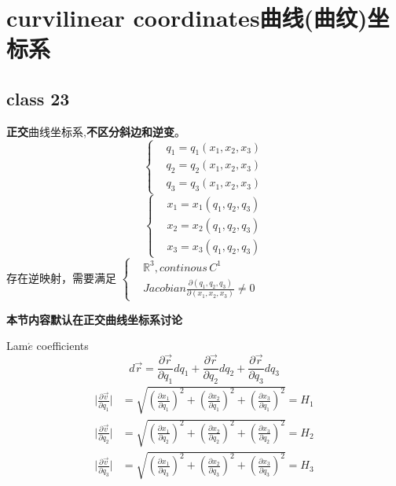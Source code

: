 \documentclass[12pt, a4paper, oneside, UTF8]{ctexbook}  %
\newcommand{\pa}{\partial}
\begin{document}
\else
\fi
\chapter{curvilinear coordinates曲线(曲纹)坐标系}
\section{class 23}
\begin{defn}

    \textbf{正交}曲线坐标系,\textbf{不区分斜边和逆变}。
    \[
  \begin{cases}
          &  q_1=q_1\left(x_1,x_2,x_3\right) \\
          &  q_2=q_2\left(x_1,x_2,x_3\right) \\
          &  q_3=q_3\left(x_1,x_2,x_3\right)
  \end{cases}
    \]
    \[
        \begin{cases}
            &  x_1=x_1\left(q_1,q_2,q_3\right) \\
            &  x_2=x_2\left(q_1,q_2,q_3\right) \\
            &  x_3=x_3\left(q_1,q_2,q_3\right)
        \end{cases}
    \]
    存在逆映射，需要满足
    $\begin{cases}
        & \mathbb{R}^3,continous\, C^1\\
        & Jacobian \frac{\pa \left(q_1,q_2,q_3\right)}{\pa \left(x_1,x_2,x_3\right)}\neq 0
    \end{cases}$
\end{defn}
\begin{center}
    \textbf{本节内容默认在正交曲线坐标系讨论}
\end{center}
\begin{defn}
    Lam$\acute{e}$ coefficients
\[
    d\vec{r}=\frac{\pa \vec{r}}{\pa q_1}d q_1+\frac{\pa \vec{r}}{\pa q_2}d q_2+\frac{\pa \vec{r}}{\pa q_3}d q_3
\]
\begin{align*}
    \lvert\frac{\pa \vec{v}}{\pa q_1}\rvert&
    =\sqrt{\left(\frac{\pa x_1}{\pa q_1}\right)^2+\left(\frac{\pa x_2}{\pa q_1}\right)^2+\left(\frac{\pa x_3}{\pa q_1}\right)^2}
    =H_1 \\
    \lvert\frac{\pa \vec{v}}{\pa q_2}\rvert&
    =\sqrt{\left(\frac{\pa x_1}{\pa q_2}\right)^2+\left(\frac{\pa x_2}{\pa q_2}\right)^2+\left(\frac{\pa x_3}{\pa q_2}\right)^2}
    =H_2 \\
    \lvert\frac{\pa \vec{v}}{\pa q_3}\rvert&
    =\sqrt{\left(\frac{\pa x_1}{\pa q_3}\right)^2+\left(\frac{\pa x_2}{\pa q_3}\right)^2+\left(\frac{\pa x_3}{\pa q_3}\right)^2}
    =H_3
\end{align*}
\end{defn}
\end{document}
